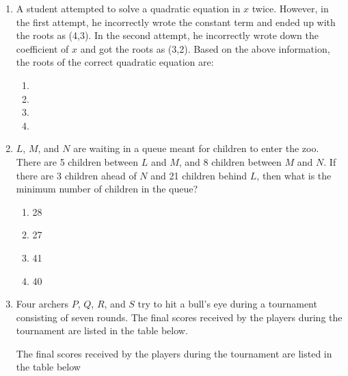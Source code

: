 \documentclass[journal,9pt,onecolumn]{IEEEtran}
\begin{document}
\begin{enumerate}
\item A student attempted to solve a quadratic equation in $x$ twice. However, in the first attempt, he incorrectly wrote the constant term and ended up with the roots as (4,3). In the second attempt, he incorrectly wrote down the coefficient of $x$ and got the roots as (3,2). Based on the above information, the roots of the correct quadratic equation are:
   \begin{multicols}{4}
   \begin{enumerate}
       \item {}
       \item {}
       \item {}
       \item {}
   \end{enumerate}
   \end{multicols}

\item $L$, $M$, and $N$ are waiting in a queue meant for children to enter the zoo. There are 5 children between $L$ and $M$, and 8 children between $M$ and $N$. If there are 3 children ahead of $N$ and 21 children behind $L$, then what is the minimum number of children in the queue?
   \begin{multicols}{4}
   \begin{enumerate}
       \item 28
       \item 27
       \item 41
       \item 40
   \end{enumerate}
   \end{multicols}

\item Four archers $P$, $Q$, $R$, and $S$ try to hit a bull's eye during a tournament consisting of seven rounds. The final scores received by the players during the tournament are listed in the table below.
\newpage
\begin{figure}[!h]
\begin{center}
    
\end{center}
\end{figure}

The final scores received by the players during the tournament are listed in the table below
   \begin{table}[!h]
       \centering
               
       \label{tab:AE-2011}
   \end{table}
   

\end{enumerate}
\end{document}
